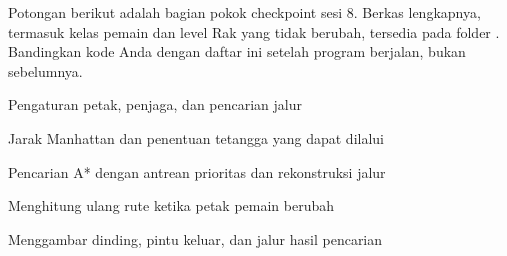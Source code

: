 
Potongan berikut adalah bagian pokok checkpoint sesi 8. Berkas lengkapnya,
termasuk kelas pemain dan level Rak yang tidak berubah, tersedia pada folder
. Bandingkan kode Anda dengan daftar ini setelah program
berjalan, bukan sebelumnya.

  {Pengaturan petak, penjaga, dan pencarian jalur}

  {Jarak Manhattan dan penentuan tetangga yang dapat dilalui}

  {Pencarian A* dengan antrean prioritas dan rekonstruksi jalur}

  {Menghitung ulang rute ketika petak pemain berubah}

  {Menggambar dinding, pintu keluar, dan jalur hasil pencarian}



